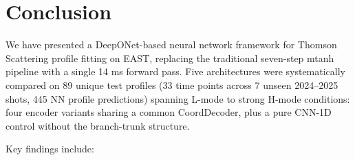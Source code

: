 \documentclass[a4paper,12pt]{article}
\begin{document}
\section{Conclusion}

We have presented a DeepONet-based neural network framework for Thomson Scattering profile fitting on EAST, replacing the traditional seven-step mtanh pipeline with a single 14 ms forward pass. Five architectures were systematically compared on 89 unique test profiles (33 time points across 7 unseen 2024--2025 shots, 445 NN profile predictions) spanning L-mode to strong H-mode conditions: four encoder variants sharing a common CoordDecoder, plus a pure CNN-1D control without the branch-trunk structure.

Key findings include:
\end{document}
